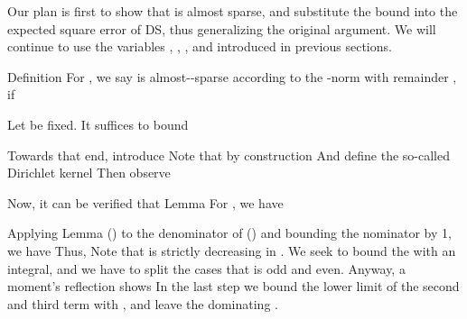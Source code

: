 \startchapter [title={Theorems and Proofs}]

Our plan is first to show that  is almost sparse, and substitute the bound into the expected square error of DS, thus generalizing the original argument.
We will continue to use the variables , , , and  introduced in previous sections.

\startsection [title={Almost-Sparsity of Array Response \m {\V{a}}}]

\Result
{Definition}
{
For , we say  is almost--sparse according to the -norm with remainder , if
}

Let \m {\f} be fixed.
It suffices to bound

Towards that end, introduce
Note that by construction
And define the so-called Dirichlet kernel
Then observe

Now, it can be verified that
\Result
{Lemma}
{
For , we have
}

Applying Lemma () to the denominator of () and bounding the nominator by 1, we have
Thus,
Note that  is strictly decreasing in .
We seek to bound the  with an integral, and we have to split the cases that  is odd and even.
Anyway, a moment's reflection shows
In the last step we bound the lower limit of the second and third term with , and leave the dominating .

